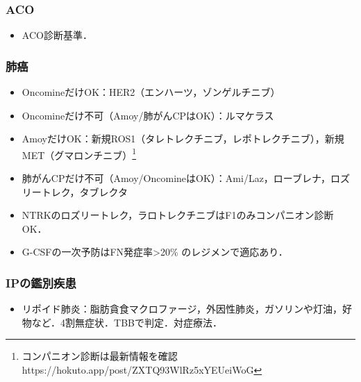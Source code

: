 \subsubsection{ACO}

\begin{itemize}
\item ACO診断基準．

\end{itemize}

\subsubsection{肺癌}
\begin{itemize}
\item OncomineだけOK：HER2（エンハーツ，ゾンゲルチニブ）
\item Oncomineだけ不可（Amoy/肺がんCPはOK）：ルマケラス
\item AmoyだけOK：新規ROS1（タレトレクチニブ，レポトレクチニブ），新規MET（グマロンチニブ）\footnote{コンパニオン診断は最新情報を確認 https://hokuto.app/post/ZXTQ93WlRz5xYEUeiWoG}
\item 肺がんCPだけ不可（Amoy/OncomineはOK）：Ami/Laz，ローブレナ，ロズリートレク，タブレクタ
\item NTRKのロズリートレク，ラロトレクチニブはF1のみコンパニオン診断OK．


\item G-CSFの一次予防はFN発症率>20\% のレジメンで適応あり．


\end{itemize}


\subsubsection{IPの鑑別疾患}
\begin{itemize}

\item リポイド肺炎：脂肪貪食マクロファージ，外因性肺炎，ガソリンや灯油，好物など．4割無症状．TBBで判定．対症療法．

\end{itemize}


